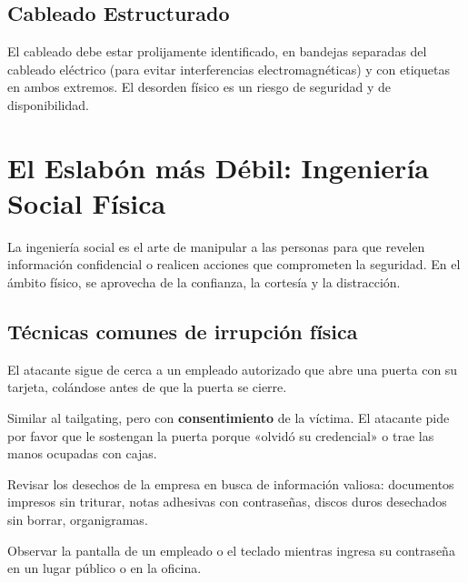 \documentclass[11pt,a4paper]{article}
\begin{document}
\subsection{Cableado Estructurado}
El cableado debe estar prolijamente identificado, en bandejas separadas del cableado eléctrico (para evitar interferencias electromagnéticas) y con etiquetas en ambos extremos. El desorden físico es un riesgo de seguridad y de disponibilidad.

\section{El Eslabón más Débil: Ingeniería Social Física}
La ingeniería social es el arte de manipular a las personas para que revelen información confidencial o realicen acciones que comprometen la seguridad. En el ámbito físico, se aprovecha de la confianza, la cortesía y la distracción.

\subsection{Técnicas comunes de irrupción física}
\begin{definicion}
El atacante sigue de cerca a un empleado autorizado que abre una puerta con su tarjeta, colándose antes de que la puerta se cierre.
\end{definicion}

\begin{definicion}
Similar al tailgating, pero con \textbf{consentimiento} de la víctima. El atacante pide por favor que le sostengan la puerta porque «olvidó su credencial» o trae las manos ocupadas con cajas.
\end{definicion}

\begin{definicion}
Revisar los desechos de la empresa en busca de información valiosa: documentos impresos sin triturar, notas adhesivas con contraseñas, discos duros desechados sin borrar, organigramas.
\end{definicion}

\begin{definicion}
Observar la pantalla de un empleado o el teclado mientras ingresa su contraseña en un lugar público o en la oficina.
\end{definicion}
\end{document}
